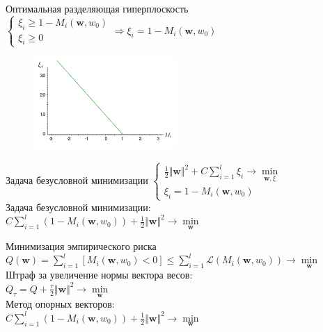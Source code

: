 \documentclass[12pt]{beamer}
\begin{document}
\begin{frame}{Оптимальная разделяющая гиперплоскость}
	$\begin{cases}
		\xi_i \geq 1 - M_i(\mathbf{w}, w_0) \\
		\xi_i \geq 0
	\end{cases} \Rightarrow \xi_i = 1 - M_i(\mathbf{w}, w_0) $\\
	\begin{figure}[htbp]
	  \includegraphics[height=100pt, keepaspectratio = true]{images/xi}   
  \end{figure}
\end{frame}

\begin{frame}{Задача безусловной минимизации}
	$\begin{cases}
		{\frac{1}{2}\Vert \mathbf{w} \Vert^2 + C \sum\limits_{i=1}^l \xi_i \rightarrow \min\limits_{\mathbf{w}, \xi}}\\
		\xi_i = 1 - M_i(\mathbf{w}, w_0)
	\end{cases}$\\
	\bigbreak
	\pause
	Задача безусловной минимизации:\\
	$ C \sum\limits_{i=1}^l (1 - M_i(\mathbf{w}, w_0)) + \frac{1}{2}\Vert \mathbf{w} \Vert^2 \rightarrow \min\limits_{\mathbf{w}}$
\end{frame}

\begin{frame}
\end{frame}

\begin{frame}{Минимизация эмпирического риска}
	${Q(\mathbf{w}) = \sum\limits_{i=1}^l \left[ M_i(\mathbf{w}, w_0) < 0 \right] \leq\sum\limits_{i=1}^l \mathcal{L}(M_i(\mathbf{w}, w_0)) \rightarrow \min\limits_{\mathbf{w}} }$\\\vspace{3mm}
	\bigbreak
	\pause
	Штраф за увеличение нормы вектора весов:\\
	$Q_{\tau} = Q + \frac{\tau}{2}\Vert \mathbf{w} \Vert^2 \rightarrow \min\limits_{\mathbf{w}}$\\
	\bigbreak
	\pause
	Метод опорных векторов:\\
	$ C\sum\limits_{i=1}^l (1 - M_i(\mathbf{w}, w_0)) + \frac{1}{2}\Vert \mathbf{w} \Vert^2 \rightarrow \min\limits_{\mathbf{w}}$
\end{frame}
\end{document}
